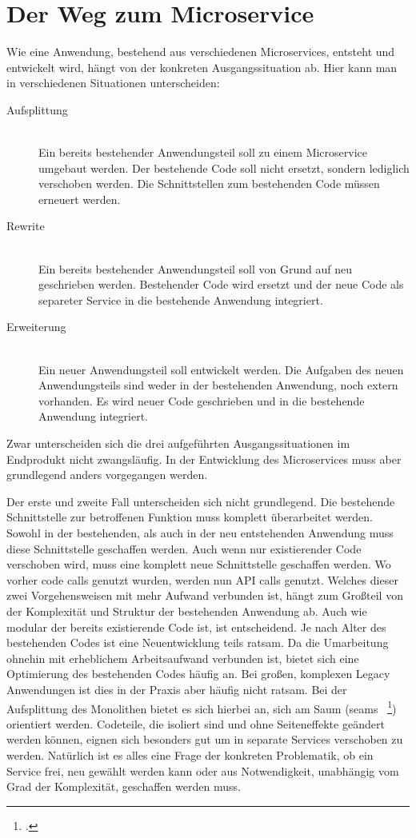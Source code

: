 \section{Der Weg zum Microservice}
Wie eine Anwendung, bestehend aus verschiedenen Microservices, entsteht und entwickelt wird, hängt von der konkreten Ausgangssituation ab. Hier kann man in verschiedenen Situationen unterscheiden:
\begin{description}
  \item[Aufsplittung] \hfill \\
  Ein bereits bestehender Anwendungsteil soll zu einem Microservice umgebaut werden. Der bestehende Code soll nicht ersetzt, sondern lediglich verschoben werden. Die Schnittstellen zum bestehenden Code müssen erneuert werden.
  \item[Rewrite] \hfill \\
  Ein bereits bestehender Anwendungsteil soll von Grund auf neu geschrieben werden. Bestehender Code wird ersetzt und der neue Code als separeter Service in die bestehende Anwendung integriert.
  \item[Erweiterung] \hfill \\
  Ein neuer Anwendungsteil soll entwickelt werden. Die Aufgaben des neuen Anwendungsteils sind weder in der bestehenden Anwendung, noch extern vorhanden. Es wird neuer Code geschrieben und in die bestehende Anwendung integriert.
\end{description}
Zwar unterscheiden sich die drei aufgeführten Ausgangssituationen im Endprodukt nicht zwangsläufig. In der Entwicklung des Microservices muss aber grundlegend anders vorgegangen werden. 

Der erste und zweite Fall unterscheiden sich nicht grundlegend. Die bestehende Schnittstelle zur betroffenen Funktion muss komplett überarbeitet werden. Sowohl in der bestehenden, als auch in der neu entstehenden Anwendung muss diese Schnittstelle geschaffen werden. Auch wenn nur existierender Code verschoben wird, muss eine komplett neue Schnittstelle geschaffen werden. Wo vorher code calls genutzt wurden, werden nun API calls genutzt.
Welches dieser zwei Vorgehensweisen mit mehr Aufwand verbunden ist, hängt zum Großteil von der Komplexität und Struktur der bestehenden Anwendung ab. Auch wie modular der bereits existierende Code ist, ist entscheidend. Je nach Alter des bestehenden Codes ist eine Neuentwicklung teils ratsam. Da die Umarbeitung ohnehin mit erheblichem Arbeitsaufwand verbunden ist, bietet sich eine Optimierung des bestehenden Codes häufig an. Bei großen, komplexen Legacy Anwendungen ist dies in der Praxis aber häufig nicht ratsam.
Bei der Aufsplittung des Monolithen bietet es sich hierbei an, sich am Saum (seams ~\footcite[vgl.][Seite 29 ff.]{feathers2004working}) orientiert werden. Codeteile, die isoliert sind und ohne Seiteneffekte geändert werden können, eignen sich besonders gut um in separate Services verschoben zu werden. Natürlich ist es alles eine Frage der konkreten Problematik, ob ein Service frei, neu gewählt werden kann oder aus Notwendigkeit, unabhängig vom Grad der Komplexität, geschaffen werden muss.

